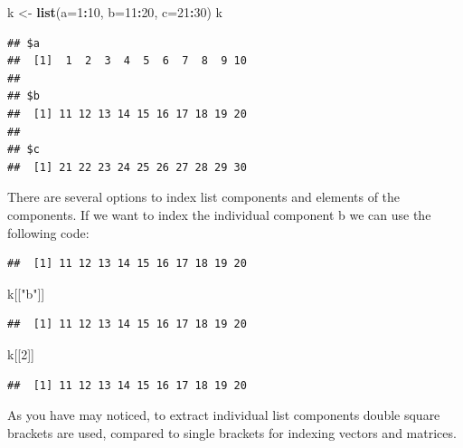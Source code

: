 \documentclass[]{book}
\newenvironment{Shaded}{\begin{snugshade}}{\end{snugshade}}
\newcommand{\KeywordTok}[1]{\textcolor[rgb]{0.13,0.29,0.53}{\textbf{#1}}}
\newcommand{\DataTypeTok}[1]{\textcolor[rgb]{0.13,0.29,0.53}{#1}}
\newcommand{\DecValTok}[1]{\textcolor[rgb]{0.00,0.00,0.81}{#1}}
\newcommand{\StringTok}[1]{\textcolor[rgb]{0.31,0.60,0.02}{#1}}
\newcommand{\OperatorTok}[1]{\textcolor[rgb]{0.81,0.36,0.00}{\textbf{#1}}}
\newcommand{\NormalTok}[1]{#1}
\theoremstyle{definition}
\theoremstyle{definition}
\theoremstyle{definition}
\theoremstyle{remark}
\begin{document}
\begin{Shaded}
\begin{Highlighting}[]
\NormalTok{k <-}\StringTok{ }\KeywordTok{list}\NormalTok{(}\DataTypeTok{a=}\DecValTok{1}\OperatorTok{:}\DecValTok{10}\NormalTok{, }\DataTypeTok{b=}\DecValTok{11}\OperatorTok{:}\DecValTok{20}\NormalTok{, }\DataTypeTok{c=}\DecValTok{21}\OperatorTok{:}\DecValTok{30}\NormalTok{)}
\NormalTok{k}
\end{Highlighting}
\end{Shaded}

\begin{verbatim}
## $a
##  [1]  1  2  3  4  5  6  7  8  9 10
## 
## $b
##  [1] 11 12 13 14 15 16 17 18 19 20
## 
## $c
##  [1] 21 22 23 24 25 26 27 28 29 30
\end{verbatim}

There are several options to index list components and elements of the
components. If we want to index the individual component b we can use
the following code:

\begin{Shaded}
\end{Shaded}

\begin{verbatim}
##  [1] 11 12 13 14 15 16 17 18 19 20
\end{verbatim}

\begin{Shaded}
\begin{Highlighting}[]
\NormalTok{k[[}\StringTok{"b"}\NormalTok{]]}
\end{Highlighting}
\end{Shaded}

\begin{verbatim}
##  [1] 11 12 13 14 15 16 17 18 19 20
\end{verbatim}

\begin{Shaded}
\begin{Highlighting}[]
\NormalTok{k[[}\DecValTok{2}\NormalTok{]]}
\end{Highlighting}
\end{Shaded}

\begin{verbatim}
##  [1] 11 12 13 14 15 16 17 18 19 20
\end{verbatim}

As you have may noticed, to extract individual list components double
square brackets are used, compared to single brackets for indexing
vectors and matrices.
\end{document}
